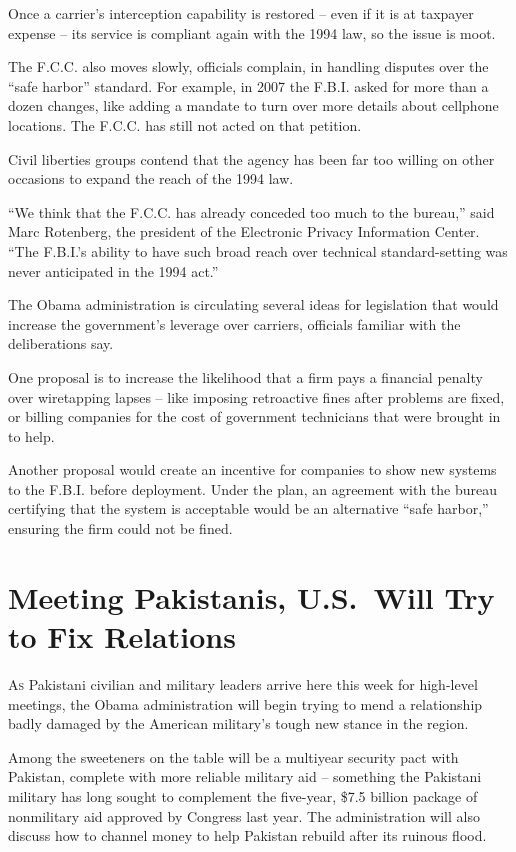 ﻿\documentclass[12pt]{article}
\begin{document}
Once a carrier's interception capability is restored -- even if it is at taxpayer expense -- its
service is compliant again with the 1994 law, so the issue is moot.

The F.C.C. also moves slowly, officials complain, in handling disputes over the ``safe harbor''
standard. For example, in 2007 the F.B.I. asked for more than a dozen changes, like adding a mandate
to turn over more details about cellphone locations. The F.C.C. has still not acted on that
petition.

Civil liberties groups contend that the agency has been far too willing on other occasions to expand
the reach of the 1994 law.

``We think that the F.C.C. has already conceded too much to the bureau,'' said Marc Rotenberg, the
president of the Electronic Privacy Information Center. ``The F.B.I.'s ability to have such broad
reach over technical standard-setting was never anticipated in the 1994 act.''

The Obama administration is circulating several ideas for legislation that would increase the
government's leverage over carriers, officials familiar with the deliberations say.

One proposal is to increase the likelihood that a firm pays a financial penalty over wiretapping
lapses -- like imposing retroactive fines after problems are fixed, or billing companies for the
cost of government technicians that were brought in to help.

Another proposal would create an incentive for companies to show new systems to the F.B.I. before
deployment. Under the plan, an agreement with the bureau certifying that the system is acceptable
would be an alternative ``safe harbor,'' ensuring the firm could not be fined.

\section{Meeting Pakistanis, U.S.~Will Try to Fix Relations}

\lettrine{A}{s} Pakistani civilian and military leaders arrive here this
week for high-level meetings, the Obama administration will begin trying to mend a relationship
badly damaged by the American military's tough new stance in the region.

Among the sweeteners on the table will be a multiyear security pact with Pakistan, complete with
more reliable military aid -- something the Pakistani military has long sought to complement the
five-year, \$7.5 billion package of nonmilitary aid approved by Congress last year. The
administration will also discuss how to channel money to help Pakistan rebuild after its ruinous
flood.
\end{document}
